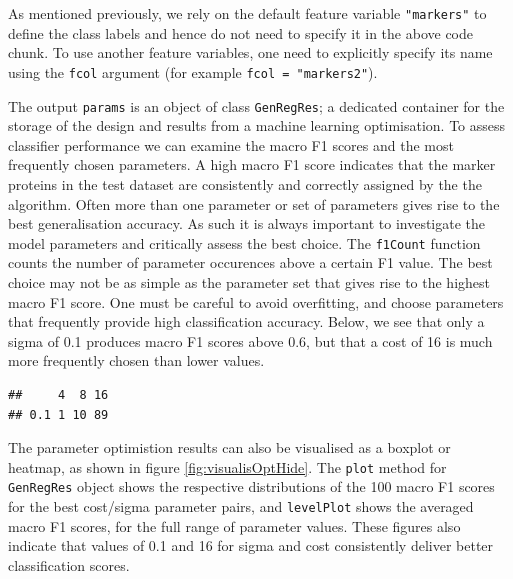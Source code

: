 As mentioned previously, we rely on the default feature variable
\texttt{"markers"} to define the class labels and hence do not need to
specify it in the above code chunk.  To use another feature variables,
one need to explicitly specify its name using the \texttt{fcol}
argument (for example \texttt{fcol = "markers2"}).

The output \texttt{params} is an object of class \texttt{GenRegRes}; a
dedicated container for the storage of the design and results from a
machine learning optimisation. To assess classifier performance we can
examine the macro F1 scores and the most frequently chosen
parameters. A high macro F1 score indicates that the marker proteins
in the test dataset are consistently and correctly assigned by the the
algorithm. Often more than one parameter or set of parameters gives
rise to the best generalisation accuracy. As such it is always
important to investigate the model parameters and critically assess
the best choice. The \texttt{f1Count} function counts the number of
parameter occurences above a certain F1 value. The best choice may not
be as simple as the parameter set that gives rise to the highest macro
F1 score. One must be careful to avoid overfitting, and choose
parameters that frequently provide high classification
accuracy. Below, we see that only a sigma of 0.1 produces macro F1
scores above 0.6, but that a cost of 16 is much more frequently chosen
than lower values.

\begin{knitrout}
\color{fgcolor}\begin{kframe}
\begin{alltt}
 \hlstd{)}
\end{alltt}
\begin{verbatim}
##     4  8 16
## 0.1 1 10 89
\end{verbatim}
\end{kframe}
\end{knitrout}

The parameter optimistion results can also be visualised as a boxplot
or heatmap, as shown in figure \ref{fig:visualisOptHide}.  The
\texttt{plot} method for \texttt{GenRegRes} object shows the
respective distributions of the 100 macro F1 scores for the best
cost/sigma parameter pairs, and \texttt{levelPlot} shows the averaged
macro F1 scores, for the full range of parameter values. These figures
also indicate that values of 0.1 and 16 for sigma and cost
consistently deliver better classification scores. 

